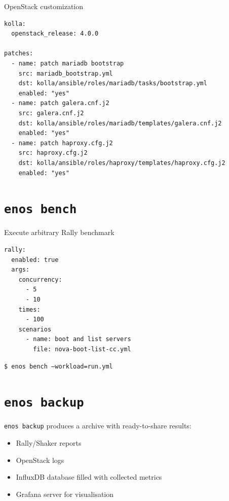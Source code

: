 \documentclass[10pt]{beamer}
\begin{document}
\begin{frame}[fragile]{OpenStack customization}
  \begin{lstlisting}
kolla:
  openstack_release: 4.0.0

patches:
  - name: patch mariadb bootstrap
    src: mariadb_bootstrap.yml
    dst: kolla/ansible/roles/mariadb/tasks/bootstrap.yml
    enabled: "yes"
  - name: patch galera.cnf.j2
    src: galera.cnf.j2
    dst: kolla/ansible/roles/mariadb/templates/galera.cnf.j2
    enabled: "yes"
  - name: patch haproxy.cfg.j2
    src: haproxy.cfg.j2
    dst: kolla/ansible/roles/haproxy/templates/haproxy.cfg.j2
    enabled: "yes"
  \end{lstlisting}
\end{frame}

\section{\texttt{enos bench}}

\begin{frame}[fragile]{\insertsectionhead}
  Execute arbitrary Rally benchmark
  \begin{lstlisting}
rally:
  enabled: true
  args:
    concurrency:
      - 5
      - 10
    times:
      - 100
    scenarios
      - name: boot and list servers
        file: nova-boot-list-cc.yml
  \end{lstlisting}
  \bigskip
  \texttt{\$ enos bench --workload=run.yml}
\end{frame}


\section{\texttt{enos backup}}
\begin{frame}{\insertsectionhead}
  \texttt{enos backup} produces a archive with ready-to-share results:
  \begin{itemize}
  \item Rally/Shaker reports
  \item OpenStack logs
  \item InfluxDB database filled with collected metrics
  \item Grafana server for visualisation
  \end{itemize}
\end{frame}
\end{document}
